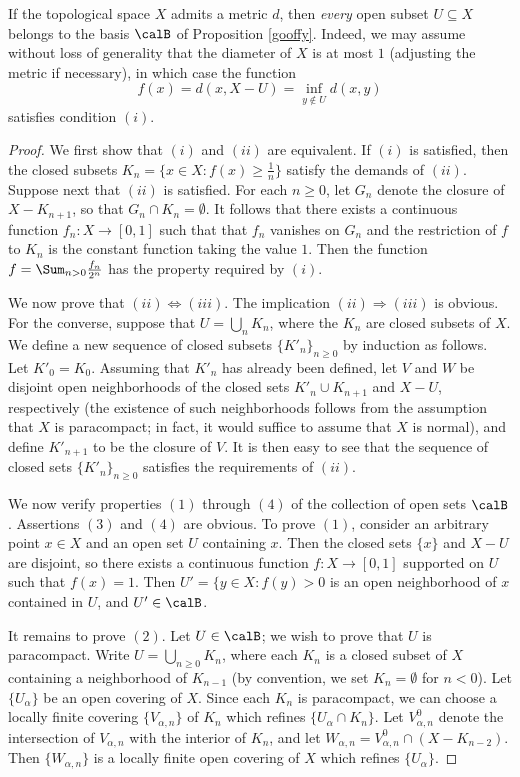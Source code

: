 \begin{remark}
If the topological space $X$ admits a metric $d$, then {\em every} open subset $U \subseteq X$
belongs to the basis $\calB$ of Proposition \ref{gooffy}. Indeed, we may assume without loss of generality that the diameter of $X$ is at most $1$ (adjusting the metric if necessary), in which case the function
$$ f(x) = d(x, X-U) = \inf_{y \notin U} d(x,y)$$
satisfies condition $(i)$.
\end{remark}

\begin{proof}
We first show that $(i)$ and $(ii)$ are equivalent. If $(i)$ is satisfied, then the closed subsets
$K_n = \{ x \in X: f(x) \geq \frac{1}{n} \}$ satisfy the demands of $(ii)$. Suppose next that $(ii)$ is satisfied.
For each $n \geq 0$, let $G_{n}$ denote the closure of $X - K_{n+1}$, so that $G_n \cap K_{n} = \emptyset$. It follows that there exists a continuous function $f_{n}: X \rightarrow [0, 1]$
such that that $f_n$ vanishes on $G_n$ and the restriction of $f$ to $K_{n}$ is the constant function taking the value $1$. Then the function $f = \Sum_{n > 0} \frac{f_n}{2^n}$ has the property required by $(i)$.

We now prove that $(ii) \Leftrightarrow (iii)$. The implication $(ii) \Rightarrow (iii)$ is obvious.
For the converse, suppose that $U = \bigcup_{n} K_n$, where the $K_n$ are closed subsets
of $X$. We define a new sequence of closed subsets $\{ K'_{n} \}_{n \geq 0}$ by induction as follows.
Let $K'_0 = K_0$. Assuming that $K'_n$ has already been defined, let $V$ and $W$ be
disjoint open neighborhoods of the closed sets $K'_{n} \cup K_{n+1}$ and $X-U$, respectively (the existence of such neighborhoods follows from the assumption that $X$ is paracompact; in fact, it would suffice to assume that $X$ is normal), and define $K'_{n+1}$ to be the closure of $V$. It is then
easy to see that the sequence of closed sets $\{ K'_{n} \}_{n \geq 0}$ satisfies the requirements of $(ii)$.

We now verify properties $(1)$ through $(4)$ of the collection of open sets $\calB$. Assertions $(3)$ and $(4)$ are obvious. To prove $(1)$, consider an arbitrary point $x \in X$ and an open set $U$ containing $x$. Then the closed sets $\{x\}$ and $X - U$ are disjoint, so there exists a continuous function
$f: X \rightarrow [0,1]$ supported on $U$ such that $f(x) = 1$. Then $U' = \{ y \in X: f(y) > 0$ is
an open neighborhood of $x$ contained in $U$, and $U' \in \calB$.

It remains to prove $(2)$. Let $U \in \calB$; we wish to prove that $U$ is paracompact. Write
$U = \bigcup_{n \geq 0} K_n$, where each $K_{n}$ is a closed subset of $X$ containing a neighborhood of $K_{n-1}$ (by convention, we set $K_{n} = \emptyset$ for $n < 0$). 
Let $\{ U_{\alpha} \}$ be an open covering of $X$. Since
each $K_n$ is paracompact, we can choose a locally finite covering
$\{ V_{\alpha, n} \}$ of $K_n$ which refines $\{ U_{\alpha} \cap K_n \}$. Let
$V^{0}_{\alpha,n}$ denote the intersection of $V_{\alpha,n}$ with 
the interior of $K_n$, and let $W_{\alpha,n} = V^{0}_{\alpha,n} \cap (X - K_{n-2})$. 
Then $\{ W_{\alpha, n} \}$ is a locally finite open covering of $X$ which refines
$\{ U_{\alpha} \}$.
\end{proof}

